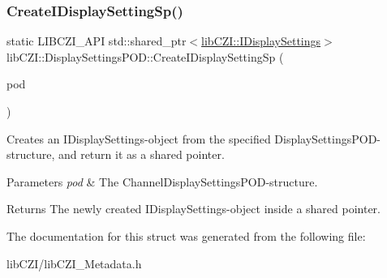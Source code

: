 \subsubsection{\texorpdfstring{Create\+I\+Display\+Setting\+Sp()}{CreateIDisplaySettingSp()}}
{\footnotesize\ttfamily static L\+I\+B\+C\+Z\+I\+\_\+\+A\+PI std\+::shared\+\_\+ptr$<$\hyperlink{classlib_c_z_i_1_1_i_display_settings}{lib\+C\+Z\+I\+::\+I\+Display\+Settings}$>$ lib\+C\+Z\+I\+::\+Display\+Settings\+P\+O\+D\+::\+Create\+I\+Display\+Setting\+Sp (\begin{DoxyParamCaption}\item[{const \hyperlink{structlib_c_z_i_1_1_display_settings_p_o_d}{Display\+Settings\+P\+OD} \&}]{pod }\end{DoxyParamCaption})\hspace{0.3cm}{\ttfamily [static]}}

Creates an I\+Display\+Settings-\/object from the specified Display\+Settings\+P\+O\+D-\/structure, and return it as a shared pointer. 
\begin{DoxyParams}{Parameters}
{\em pod} & The Channel\+Display\+Settings\+P\+O\+D-\/structure. \\
\hline
\end{DoxyParams}
\begin{DoxyReturn}{Returns}
The newly created I\+Display\+Settings-\/object inside a shared pointer. 
\end{DoxyReturn}


The documentation for this struct was generated from the following file\+:\begin{DoxyCompactItemize}
\item 
lib\+C\+Z\+I/lib\+C\+Z\+I\+\_\+\+Metadata.\+h\end{DoxyCompactItemize}
